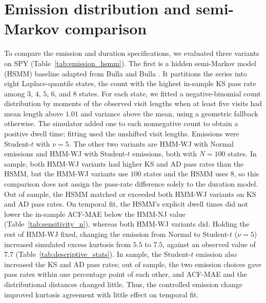 \section{Emission distribution and semi-Markov comparison}
\label{sec:supp-emission-hsmm}

To compare the emission and duration specifications, we evaluated
three variants on SPY (Table~\ref{tab:emission_hsmm}). The first is a
hidden semi-Markov model (HSMM) baseline adapted from Bulla and Bulla
\cite{bullaBulla2006}. It partitions the series into eight
Laplace-quantile states, the count with the highest in-sample KS pass
rate among $3$, $4$, $5$, $6$, and $8$ states. For each state, we fitted a negative-binomial count distribution
by moments of the observed visit lengths when at least five visits
had mean length above $1.01$ and variance above the mean, using a
geometric fallback otherwise. The simulator added one to each
nonnegative count to obtain a positive dwell time; fitting used the
unshifted visit lengths. Emissions were Student-$t$ with $\nu = 5$.
The other two variants are HMM-WJ with Normal emissions and HMM-WJ
with Student-$t$ emissions, both with $N = 100$ states. In sample,
both HMM-WJ variants had higher KS and AD pass rates than the HSMM,
but the HMM-WJ variants use $100$ states and the HSMM uses $8$, so
this comparison does not assign the pass-rate difference solely to
the duration model. Out of sample, the HSMM matched or exceeded both
HMM-WJ variants on KS and AD pass rates. On temporal fit, the HSMM's
explicit dwell times did not lower the in-sample ACF-MAE below the
HMM-NJ value (Table~\ref{tab:sensitivity_n}), whereas both HMM-WJ
variants did. Holding the rest of HMM-WJ fixed, changing the emission
from Normal to Student-$t$ ($\nu=5$) increased simulated excess
kurtosis from $5.5$ to $7.5$, against an observed value of $7.7$
(Table~\ref{tab:descriptive_stats}). In sample, the Student-$t$
emission also increased the KS and AD pass rates; out of sample, the
two emission choices gave pass rates within one percentage point of
each other, and ACF-MAE and the distributional distances changed
little. Thus, the controlled emission change improved kurtosis agreement
with little effect on temporal fit.

